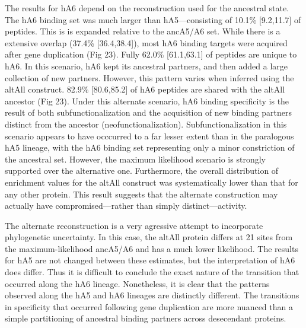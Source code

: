 The results for hA6 depend on the reconstruction used for the ancestral
state. The hA6 binding set was much larger than hA5---consisting of
10.1\% {[}9.2,11.7{]} of peptides. This is is expanded relative to
the ancA5/A6 set. While there is a extensive overlap (37.4\% {[}36.4,38.4{]}),
most hA6 binding targets were acquired after gene duplication (Fig
23). Fully 62.0\% {[}61.1,63.1{]} of peptides are unique to hA6. In
this scenario, hA6 kept its ancestral partners, and then added a large
collection of new partners. However, this pattern varies when inferred
using the altAll construct. 82.9\% {[}80.6,85.2{]} of hA6 peptides
are shared with the altAll ancestor (Fig 23). Under this alternate
scenario, hA6 binding specificity is the result of both subfunctionalization
and the acquisition of new binding partners distinct from the ancestor
(neofunctionalization). Subfunctionalization in this scenario appears
to have occcurred to a far lesser extent than in the paralogous hA5
lineage, with the hA6 binding set representing only a minor constriction
of the ancestral set. However, the maximum likelihood scenario is
strongly supported over the alternative one. Furthermore, the overall
distribution of enrichment values for the altAll construct was systematically
lower than that for any other protein. This result suggests that the
alternate construction may actually have compromised---rather than simply
distinct---activity. 

The alternate reconstruction is a very agressive attempt to incorporate
phylogenetic uncertainty. In this case, the altAll protein differs
at 21 sites from the maximum-likelihood ancA5/A6 and has a much lower
likelihood. The results for hA5 are not changed between these estimates,
but the interpretation of hA6 does differ. Thus it is difficult to
conclude the exact nature of the transition that occurred along the
hA6 lineage. Nonetheless, it is clear that the patterns observed along
the hA5 and hA6 lineages are distinctly different. The transitions
in specificity that occurred following gene duplication are more nuanced
than a simple partitioning of ancestral binding partners across desecendant
proteins. 

